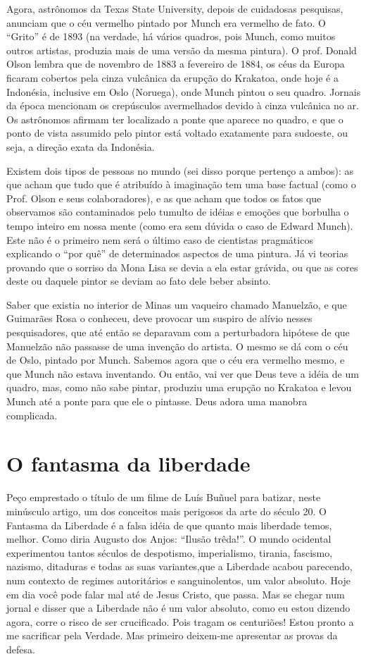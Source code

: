 Agora, astrônomos da Texas State University, depois de cuidadosas
pesquisas, anunciam que o céu vermelho pintado por Munch era vermelho
de fato. O “Grito” é de 1893 (na verdade, há vários quadros, pois
Munch, como muitos outros artistas, produzia mais de uma versão da
mesma pintura). O prof. Donald Olson lembra que de novembro de 1883 a
fevereiro de 1884, os céus da Europa ficaram cobertos pela cinza
vulcânica da erupção do Krakatoa, onde hoje é a Indonésia, inclusive
em Oslo (Noruega), onde Munch pintou o seu quadro. Jornais da época
mencionam os crepúsculos avermelhados devido à cinza vulcânica no ar.
Os astrônomos afirmam ter localizado a ponte que aparece no quadro, e
que o ponto de vista assumido pelo pintor está voltado exatamente
para sudoeste, ou seja, a direção exata da Indonésia.

Existem dois tipos de pessoas no mundo (sei disso porque pertenço a
ambos): as que acham que tudo que é atribuído à imaginação tem uma
base factual (como o Prof. Olson e seus colaboradores), e as que
acham que todos os fatos que observamos são contaminados pelo tumulto
de idéias e emoções que borbulha o tempo inteiro em nossa mente (como
era sem dúvida o caso de Edward Munch). Este não é o primeiro nem
será o último caso de cientistas pragmáticos explicando o “por quê”
de determinados aspectos de uma pintura. Já vi teorias provando que o
sorriso da Mona Lisa se devia a ela estar grávida, ou que as cores
deste ou daquele pintor se deviam ao fato dele beber absinto. 

Saber que existia no interior de Minas um vaqueiro chamado Manuelzão,
e que Guimarães Rosa o conheceu, deve provocar um suspiro de alívio
nesses pesquisadores, que até então se deparavam com a perturbadora
hipótese de que Manuelzão não passasse de uma invenção do artista.  O
mesmo se dá com o céu de Oslo, pintado por Munch. Sabemos agora que o
céu era vermelho mesmo, e que Munch não estava inventando. Ou então,
vai ver que Deus teve a idéia de um quadro, mas, como não sabe
pintar, produziu uma erupção no Krakatoa e levou Munch até a ponte
para que ele o pintasse. Deus adora uma manobra complicada.

\chapter{O fantasma da liberdade}

Peço emprestado o título de um filme de Luís Buñuel para batizar,
neste minúsculo artigo, um dos conceitos mais perigosos da arte do
século 20.  O Fantasma da Liberdade é a falsa idéia de que quanto
mais liberdade temos, melhor. Como diria Augusto dos Anjos: “Ilusão
trêda!”.  O mundo ocidental experimentou tantos séculos de
despotismo, imperialismo, tirania, fascismo, nazismo, ditaduras e
todas as suas variantes,que a Liberdade acabou parecendo, num
contexto de regimes autoritários e sanguinolentos, um valor absoluto.
Hoje em dia você pode falar mal até de Jesus Cristo, que passa. Mas
se chegar num jornal e disser que a Liberdade não é um valor
absoluto, como eu estou dizendo agora, corre o risco de ser
crucificado. Pois tragam os centuriões! Estou pronto a me sacrificar
pela Verdade. Mas primeiro deixem-me apresentar as provas da defesa.

